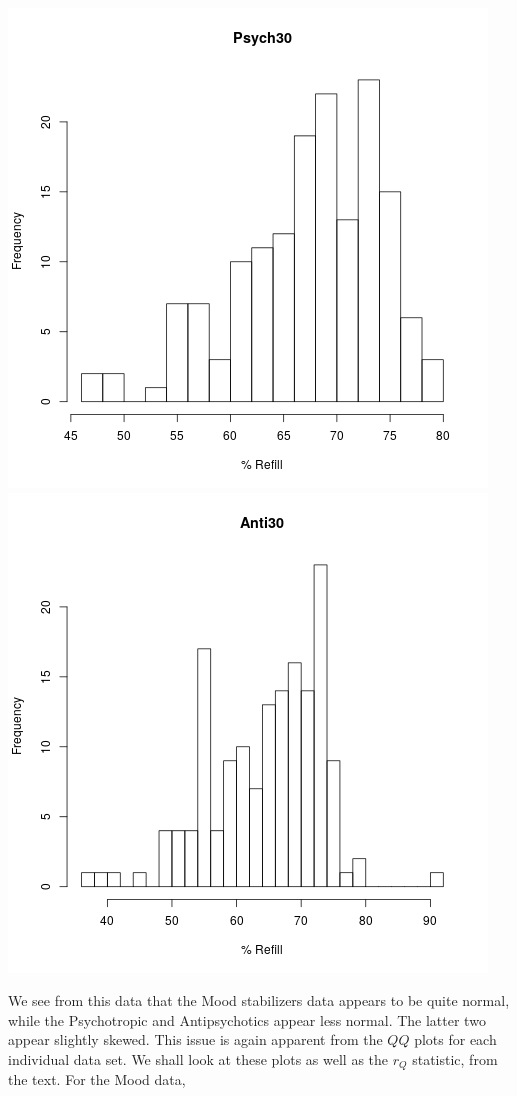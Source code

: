 \documentclass[letterpaper,10pt]{article}
\begin{document}
\begin{enumerate}
\begin{center}
\includegraphics[scale=.33]{psychhist.png}
\includegraphics[scale=.33]{antihist.png}
\end{center}
We see from this data that the Mood stabilizers data appears to be quite normal, while the Psychotropic and Antipsychotics appear less normal. The latter two appear slightly skewed. This issue is again apparent from the $QQ$ plots for each individual data set. We shall look at these plots as well as the $r_Q$ statistic, from the text. For the Mood data,

\end{enumerate}
\end{document}
